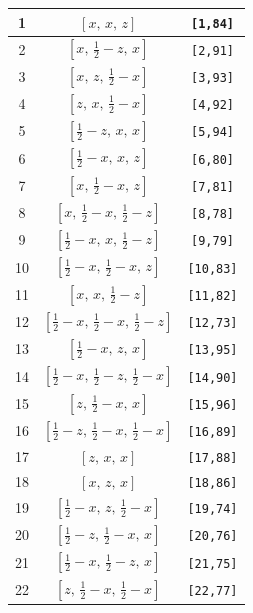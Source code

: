 \documentclass[fleqn,8pt]{jsarticle}
\begin{document}
\begin{longtable}{ccc}
1 & $\left[ x,\, x,\, z \right]$ & {\tt [1,84]} \\ \hline
2 & $\left[ x,\, \frac{1}{2} - z,\, x \right]$ & {\tt [2,91]} \\ \hline
3 & $\left[ x,\, z,\, \frac{1}{2} - x \right]$ & {\tt [3,93]} \\ \hline
4 & $\left[ z,\, x,\, \frac{1}{2} - x \right]$ & {\tt [4,92]} \\ \hline
5 & $\left[ \frac{1}{2} - z,\, x,\, x \right]$ & {\tt [5,94]} \\ \hline
6 & $\left[ \frac{1}{2} - x,\, x,\, z \right]$ & {\tt [6,80]} \\ \hline
7 & $\left[ x,\, \frac{1}{2} - x,\, z \right]$ & {\tt [7,81]} \\ \hline
8 & $\left[ x,\, \frac{1}{2} - x,\, \frac{1}{2} - z \right]$ & {\tt [8,78]} \\ \hline
9 & $\left[ \frac{1}{2} - x,\, x,\, \frac{1}{2} - z \right]$ & {\tt [9,79]} \\ \hline
10 & $\left[ \frac{1}{2} - x,\, \frac{1}{2} - x,\, z \right]$ & {\tt [10,83]} \\ \hline
11 & $\left[ x,\, x,\, \frac{1}{2} - z \right]$ & {\tt [11,82]} \\ \hline
12 & $\left[ \frac{1}{2} - x,\, \frac{1}{2} - x,\, \frac{1}{2} - z \right]$ & {\tt [12,73]} \\ \hline
13 & $\left[ \frac{1}{2} - x,\, z,\, x \right]$ & {\tt [13,95]} \\ \hline
14 & $\left[ \frac{1}{2} - x,\, \frac{1}{2} - z,\, \frac{1}{2} - x \right]$ & {\tt [14,90]} \\ \hline
15 & $\left[ z,\, \frac{1}{2} - x,\, x \right]$ & {\tt [15,96]} \\ \hline
16 & $\left[ \frac{1}{2} - z,\, \frac{1}{2} - x,\, \frac{1}{2} - x \right]$ & {\tt [16,89]} \\ \hline
17 & $\left[ z,\, x,\, x \right]$ & {\tt [17,88]} \\ \hline
18 & $\left[ x,\, z,\, x \right]$ & {\tt [18,86]} \\ \hline
19 & $\left[ \frac{1}{2} - x,\, z,\, \frac{1}{2} - x \right]$ & {\tt [19,74]} \\ \hline
20 & $\left[ \frac{1}{2} - z,\, \frac{1}{2} - x,\, x \right]$ & {\tt [20,76]} \\ \hline
21 & $\left[ \frac{1}{2} - x,\, \frac{1}{2} - z,\, x \right]$ & {\tt [21,75]} \\ \hline
22 & $\left[ z,\, \frac{1}{2} - x,\, \frac{1}{2} - x \right]$ & {\tt [22,77]} \\ \hline

\end{longtable}
\end{document}

